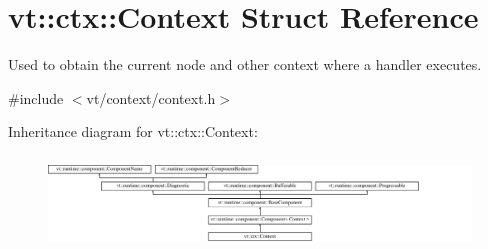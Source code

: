 \hypertarget{structvt_1_1ctx_1_1_context}{}\section{vt\+:\+:ctx\+:\+:Context Struct Reference}
\label{structvt_1_1ctx_1_1_context}


Used to obtain the current node and other context where a handler executes.  




{\ttfamily \#include $<$vt/context/context.\+h$>$}

Inheritance diagram for vt\+:\+:ctx\+:\+:Context\+:\begin{figure}[H]
\begin{center}
\leavevmode
\includegraphics[height=2.508961cm]{structvt_1_1ctx_1_1_context}
\end{center}
\end{figure}
